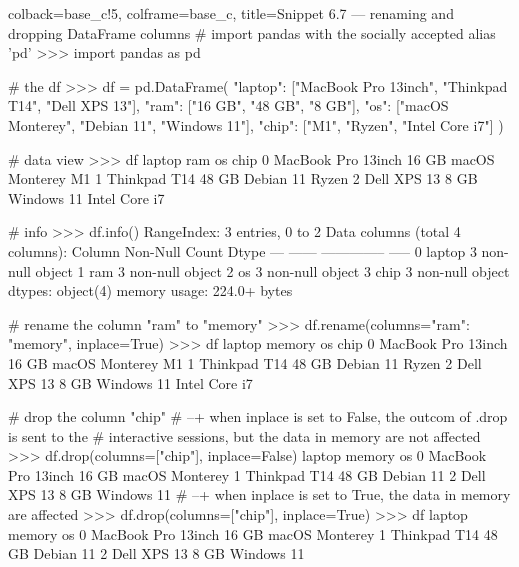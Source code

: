 \documentclass[a4paper,11pt]{book}
\begin{document}
\begin{pythoncode}[linenos=True]{colback=base_c!5, colframe=base_c, title=\sffamily Snippet 6.7 --- renaming and dropping DataFrame columns}
# import pandas with the socially accepted alias 'pd'
>>> import pandas as pd

# the df 
>>> df = pd.DataFrame(
	{
	    "laptop": ["MacBook Pro 13inch", "Thinkpad T14", "Dell XPS 13"],
	    "ram": ["16 GB", "48 GB", "8 GB"],
	    "os": ["macOS Monterey", "Debian 11", "Windows 11"],
	    "chip": ["M1", "Ryzen", "Intel Core i7"]
	}
    )

# data view
>>> df
               laptop    ram              os           chip
0  MacBook Pro 13inch  16 GB  macOS Monterey             M1
1        Thinkpad T14  48 GB       Debian 11          Ryzen
2         Dell XPS 13   8 GB      Windows 11  Intel Core i7 

# info
>>> df.info()
RangeIndex: 3 entries, 0 to 2
Data columns (total 4 columns):
     Column  Non-Null Count  Dtype 
---  ------  --------------  ----- 
 0   laptop  3 non-null      object
 1   ram     3 non-null      object
 2   os      3 non-null      object
 3   chip    3 non-null      object
dtypes: object(4)
memory usage: 224.0+ bytes

# rename the column "ram" to "memory"
>>> df.rename(columns={"ram": "memory"}, inplace=True)
>>> df
               laptop memory              os           chip
0  MacBook Pro 13inch  16 GB  macOS Monterey             M1
1        Thinkpad T14  48 GB       Debian 11          Ryzen
2         Dell XPS 13   8 GB      Windows 11  Intel Core i7

# drop the column "chip"
# --+ when inplace is set to False, the outcom of .drop is sent to the 
# interactive sessions, but the data in memory are not affected
>>> df.drop(columns=["chip"], inplace=False)
               laptop memory              os
0  MacBook Pro 13inch  16 GB  macOS Monterey
1        Thinkpad T14  48 GB       Debian 11
2         Dell XPS 13   8 GB      Windows 11
# --+ when inplace is set to True, the data in memory are affected
>>> df.drop(columns=["chip"], inplace=True)
>>> df
               laptop memory              os
0  MacBook Pro 13inch  16 GB  macOS Monterey
1        Thinkpad T14  48 GB       Debian 11
2         Dell XPS 13   8 GB      Windows 11

\end{pythoncode}
\clearpage
\end{document}
